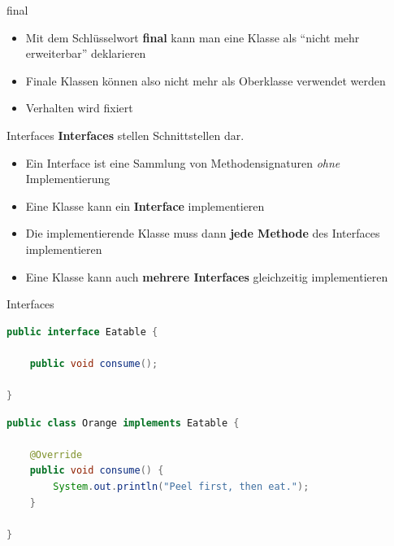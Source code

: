 \documentclass[18pt]{beamer}
\newcommand{\quotes}[1]{``#1''}
\begin{document}
\begin{frame}{final}
    \begin{itemize}
        \item Mit dem Schlüsselwort \textbf{final} kann man eine Klasse als \quotes{nicht mehr erweiterbar} deklarieren
        \item Finale Klassen können also nicht mehr als Oberklasse verwendet werden
        \item Verhalten wird fixiert
    \end{itemize}
\end{frame}

\begin{frame}{Interfaces}
    \textbf{Interfaces} stellen Schnittstellen dar.
    \begin{itemize}
        \item Ein Interface ist eine Sammlung von Methodensignaturen \textit{ohne} Implementierung
        \item Eine Klasse kann ein \textbf{Interface} implementieren
        \item Die implementierende Klasse muss dann \textbf{jede Methode} des Interfaces implementieren
        \item Eine Klasse kann auch \textbf{mehrere Interfaces} gleichzeitig implementieren
    \end{itemize}
\end{frame}

\begin{frame}[fragile]{Interfaces}
    \begin{exampleblock}{}
        \begin{lstlisting}[language=Java,basicstyle=\scriptsize]
public interface Eatable {

    public void consume();

}
        \end{lstlisting}

    \end{exampleblock}

    \begin{exampleblock}{}
        \begin{lstlisting}[language=Java,basicstyle=\scriptsize]
public class Orange implements Eatable {

    @Override
    public void consume() {
        System.out.println("Peel first, then eat.");
    }

}
        \end{lstlisting}

    \end{exampleblock}

\end{frame}
\end{document}
